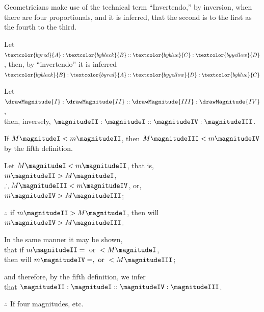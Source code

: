 \documentclass[booklanguage=english]{byrnebook}
\begin{document}
\label{def:V.XIV} 
\def\varA{\textcolor{byred}{A}}
\def\varB{\textcolor{byblack}{B}}
\def\varC{\textcolor{byblue}{C}}
\def\varD{\textcolor{byyellow}{D}}
Geometricians make use of the technical term \enquote{Invertendo,} by inversion, when there are four proportionals, and it is inferred, that the second is to the first as the fourth to the third.

Let $\varA : \varB :: \varC : \varD$, then, by \enquote{invertendo} it is inferred $\varB : \varA :: \varD : \varC$

\vfill\pagebreak

\label{prop:V.B} %

\begin{center}
Let $\drawMagnitude{I} : \drawMagnitude{II} :: \drawMagnitude{III} : \drawMagnitude{IV}$,\\
then, inversely, $\magnitudeII : \magnitudeI :: \magnitudeIV : \magnitudeIII$.

If $M \magnitudeI < m \magnitudeII$, then $M \magnitudeIII < m \magnitudeIV$\\
by the fifth definition.

Let $M \magnitudeI < m \magnitudeII$, that is, $m \magnitudeII > M \magnitudeI$,\\
$\therefore M \magnitudeIII < m \magnitudeIV$, or, $m \magnitudeIV > M \magnitudeIII$;

$\therefore$ if $m \magnitudeII > M \magnitudeI$, then will $m \magnitudeIV > M \magnitudeIII$.

In the same manner it may be shown,\\
that if $m \magnitudeII = \mbox{ or } < M \magnitudeI$,\\
then will $m \magnitudeIV =, \mbox{ or } < M \magnitudeIII$;

and therefore, by the fifth definition, we infer\\
that $\magnitudeII : \magnitudeI :: \magnitudeIV : \magnitudeIII$.

$\therefore$ If four magnitudes, etc.
\end{center}

\vfill\pagebreak
\end{document}
